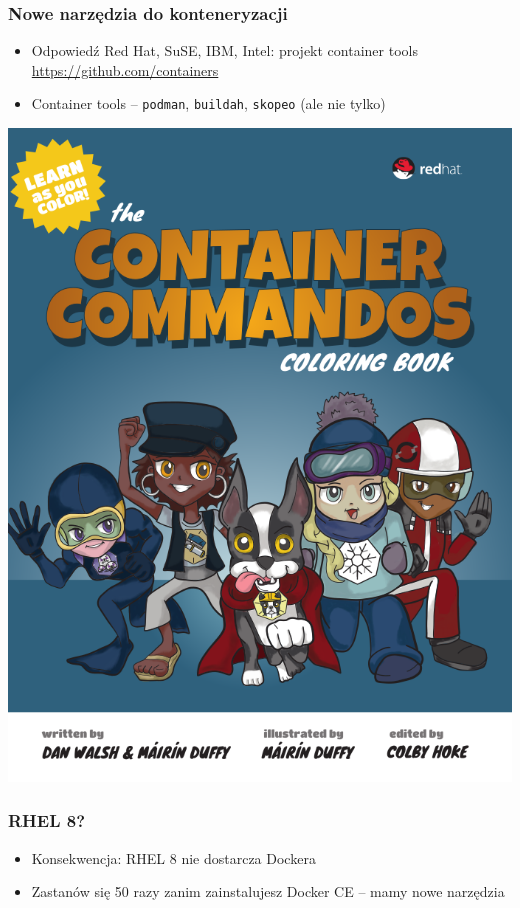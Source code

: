 \documentclass[dvipsnames,table]{beamer}
\begin{document}
\begin{frame}
	\frametitle{Nowe narzędzia do konteneryzacji}
	\begin{itemize}
		\item Odpowiedź Red Hat, SuSE, IBM, Intel: projekt container tools \url{https://github.com/containers} 
		\item Container tools -- {\tt podman}, {\tt buildah}, {\tt skopeo} (ale nie tylko)
\end{itemize}
	\begin{center}
		\includegraphics[scale=0.20]{img-commandos.png}
	\end{center}
\end{frame}

\begin{frame}
	\frametitle{RHEL 8?}
	\begin{itemize}
		\item Konsekwencja: RHEL 8 nie dostarcza Dockera
		\item Zastanów się 50 razy zanim zainstalujesz Docker CE -- mamy nowe narzędzia
	\end{itemize}
\end{frame}
\end{document}
